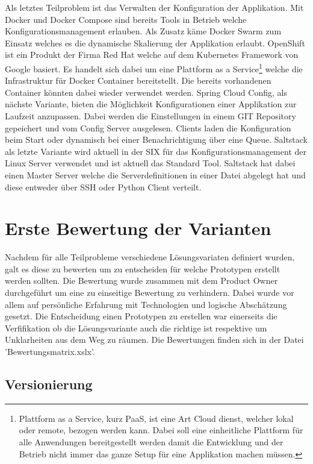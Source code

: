 Als letztes Teilproblem ist das Verwalten der Konfiguration der Applikation. Mit Docker und Docker Compose sind bereits Tools in Betrieb welche Konfigurationsmanagement erlauben. Als Zusatz käme Docker Swarm zum Einsatz welches es die dynamische Skalierung der Applikation erlaubt.\newline
OpenShift ist ein Produkt der Firma Red Hat welche auf dem Kubernetes Framework von Google basiert. Es handelt sich dabei um eine Plattform as a Service\footnote{Plattform as a Service, kurz PaaS, ist eine Art Cloud dienst, welcher lokal oder remote, bezogen werden kann. Dabei soll eine einheitliche Plattform für alle Anwendungen bereitgestellt werden damit die Entwicklung und der Betrieb nicht immer das ganze Setup für eine Applikation machen müssen.} welche die Infrastruktur für Docker Container bereitstellt. Die bereits vorhandenen Container könnten dabei wieder verwendet werden.\newline
Spring Cloud Config, als nächste Variante, bieten die Möglichkeit Konfigurationen einer Applikation zur Laufzeit anzupassen. Dabei werden die Einstellungen in einem GIT Repository gepeichert und vom Config Server ausgelesen. Clients laden die Konfiguration beim Start oder dynamisch bei einer Benachrichtigung über eine Queue.
Saltstack als letzte Variante wird aktuell in der SIX für das Konfigurationsmanagement der Linux Server verwendet und ist aktuell das Standard Tool. Saltstack hat dabei einen Master Server welche die Serverdefinitionen in einer Datei abgelegt hat und diese entweder über SSH oder Python Client verteilt.

\section{Erste Bewertung der Varianten}

Nachdem für alle Teilprobleme verschiedene Lösungsvariaten definiert wurden, galt es diese zu bewerten um zu entscheiden für welche Prototypen erstellt werden sollten. Die Bewertung wurde zusammen mit dem Product Owner durchgeführt um eine zu einseitige Bewertung zu verhindern. Dabei wurde vor allem auf persönliche Erfahrung mit Technologien und logische Abschätzung gesetzt. Die Entscheidung einen Prototypen zu erstellen war einerseits die Verfifikation ob die Lösungsvariante auch die richtige ist respektive um Unklarheiten aus dem Weg zu räumen. Die Bewertungen finden sich in der Datei 'Bewertungsmatrix.xslx'. 

\subsection{Versionierung}

